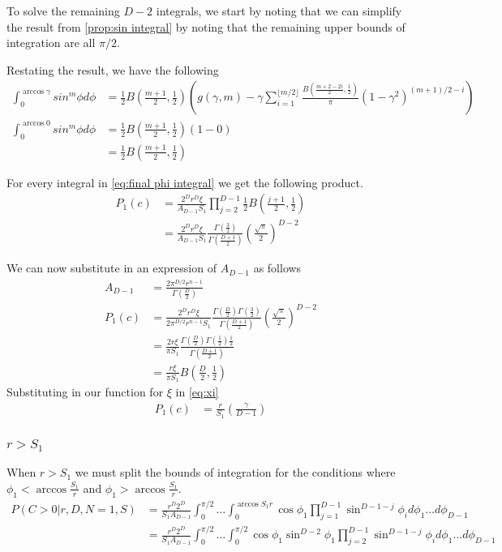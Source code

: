 \documentclass{article}
\begin{document}
To solve the remaining $D-2$ integrals, we start by noting that we can simplify the result from \ref{prop:sin integral}
by noting that the remaining upper bounds of integration are all $\pi/2$. 

Restating the result, we have the following
\begin{align}
	\int_0^{\arccos \gamma}sin^m\phi d\phi &= \frac{1}{2}B\left(\frac{m+1}{2}, \frac{1}{2}\right)\left(g(\gamma, m) - \gamma\sum_{i=1}^{\lfloor m/2 \rfloor}\frac{B(\frac{m+2-2i}{2}, \frac{1}{2})}{\pi}(1-\gamma^2)^{(m+1)/2-i}\right) \\
	\int_0^{\arccos 0}sin^m\phi d\phi &= \frac{1}{2}B\left(\frac{m+1}{2}, \frac{1}{2}\right)(1-0) \\
	&= \frac{1}{2}B\left(\frac{m+1}{2}, \frac{1}{2}\right)
\end{align}

For every integral in \ref{eq:final phi integral} we get the following product.
\begin{align}
	P_1(c) &= \frac{2^D r^D \xi}{A_{D-1} S_1}\prod_{j=2}^{D-1}\frac{1}{2}B\left(\frac{j+1}{2}, \frac{1}{2}\right) \\
	&= \frac{2^D r^D \xi}{A_{D-1} S_1} \frac{\Gamma(\frac{3}{2})}{\Gamma(\frac{D+1}{2})}\left(\frac{\sqrt{\pi}}{2}\right)^{D-2}
\end{align}

We can now substitute in an expression of $A_{D-1}$ as follows
\begin{align}
	A_{D-1} &= \frac{2\pi^{D/2}r^{n-1}}{\Gamma(\frac{D}{2})}\\
	P_1(c) &= \frac{2^D r^D \xi}{2\pi^{D/2}r^{n-1}S_1} \frac{\Gamma(\frac{D}{2})\Gamma(\frac{3}{2})}{\Gamma(\frac{D+1}{2})}\left(\frac{\sqrt{\pi}}{2}\right)^{D-2} \\
	&= \frac{2 r \xi}{\pi S_1} \frac{\Gamma(\frac{D}{2})\Gamma(\frac{1}{2})\frac{1}{2}}{\Gamma(\frac{D+1}{2})} \\
	&= \frac{r \xi}{\pi S_1}B\left(\frac{D}{2}, \frac{1}{2}\right)
\end{align}
Substituting in our function for $\xi$ in \ref{eq:xi}
\begin{align}
	P_1(c) &= \frac{r}{S_1}\left(\frac{\gamma}{D-1}\right)
\end{align}


\subsubsection{$r>S_1$}
When $r>S_1$ we must split the bounds of integration for the conditions where $\phi_1<\arccos{\frac{S_1}{r}}$ and $\phi_1>\arccos{\frac{S_1}{r}}$. 
\begin{align}
	P(C>0|r, D, N=1, S) &= \frac{r^D 2^D}{S_1 A_{D-1}}\int_0^{\pi/2} \hdots \int_0^{\arccos{S_1}{r}} \cos\phi_1 \prod_{j=1}^{D-1}\sin^{D-1-j} \phi_i d\phi_1\hdots d\phi_{D-1}\\
	&= \frac{r^D 2^D}{S_1 A_{D-1}}\int_0^{\pi/2} \hdots \int_0^{\pi/2} \cos\phi_1\sin^{D-2}\phi_1 \prod_{j=2}^{D-1}\sin^{D-1-j}\phi_i d\phi_1\hdots d\phi_{D-1}
\end{align}
\end{document}
